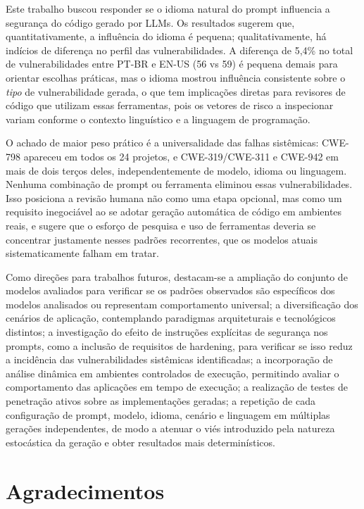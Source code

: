 \documentclass[12pt]{article}
\begin{document}
Este trabalho buscou responder se o idioma natural do prompt influencia a segurança do código gerado por LLMs. Os resultados sugerem que, quantitativamente, a influência do idioma é pequena; qualitativamente, há indícios de diferença no perfil das vulnerabilidades. A diferença de 5,4\% no total de vulnerabilidades entre PT-BR e EN-US (56 vs 59) é pequena demais para orientar escolhas práticas, mas o idioma mostrou influência consistente sobre o \textit{tipo} de vulnerabilidade gerada, o que tem implicações diretas para revisores de código que utilizam essas ferramentas, pois os vetores de risco a inspecionar variam conforme o contexto linguístico e a linguagem de programação.

O achado de maior peso prático é a universalidade das falhas sistêmicas: CWE-798 apareceu em todos os 24 projetos, e CWE-319/CWE-311 e CWE-942 em mais de dois terços deles, independentemente de modelo, idioma ou linguagem. Nenhuma combinação de prompt ou ferramenta eliminou essas vulnerabilidades. Isso posiciona a revisão humana não como uma etapa opcional, mas como um requisito inegociável ao se adotar geração automática de código em ambientes reais, e sugere que o esforço de pesquisa e uso de ferramentas deveria se concentrar justamente nesses padrões recorrentes, que os modelos atuais sistematicamente falham em tratar.

Como direções para trabalhos futuros, destacam-se a ampliação do conjunto de modelos avaliados para verificar se os padrões observados são específicos dos modelos analisados ou representam comportamento universal; a diversificação dos cenários de aplicação, contemplando paradigmas arquiteturais e tecnológicos distintos; a investigação do efeito de instruções explícitas de segurança nos prompts, como a inclusão de requisitos de hardening, para verificar se isso reduz a incidência das vulnerabilidades sistêmicas identificadas; a incorporação de análise dinâmica em ambientes controlados de execução, permitindo avaliar o comportamento das aplicações em tempo de execução; a realização de testes de penetração ativos sobre as implementações geradas; a repetição de cada configuração de prompt, modelo, idioma, cenário e linguagem em múltiplas gerações independentes, de modo a atenuar o viés introduzido pela natureza estocástica da geração e obter resultados mais determinísticos.

\section*{Agradecimentos}
\end{document}

